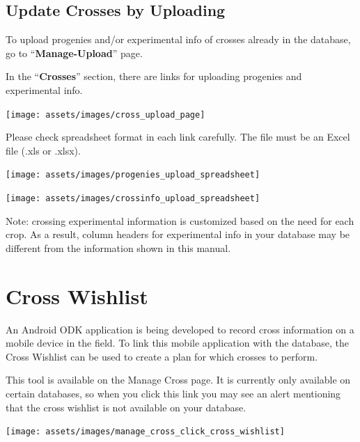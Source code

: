 \documentclass[
  12pt,
]{book}
\begin{document}
\hypertarget{update-crosses-by-uploading}{%
\subsection{Update Crosses by Uploading}\label{update-crosses-by-uploading}}

To upload progenies and/or experimental info of crosses already in the database, go to ``\textbf{Manage-Upload}'' page.

In the ``\textbf{Crosses}'' section, there are links for uploading progenies and experimental info.

\begin{center}\texttt{[image: assets/images/cross\_upload\_page]} \end{center}

Please check spreadsheet format in each link carefully. The file must be an Excel file (.xls or .xlsx).

\begin{center}\texttt{[image: assets/images/progenies\_upload\_spreadsheet]} \end{center}

\begin{center}\texttt{[image: assets/images/crossinfo\_upload\_spreadsheet]} \end{center}

Note: crossing experimental information is customized based on the need for each crop. As a result, column headers for experimental info in your database may be different from the information shown in this manual.

\hypertarget{cross-wishlist}{%
\section{Cross Wishlist}\label{cross-wishlist}}

An Android ODK application is being developed to record cross information on a mobile device in the field. To link this mobile application with the database, the Cross Wishlist can be used to create a plan for which crosses to perform.

This tool is available on the Manage Cross page. It is currently only available on certain databases, so when you click this link you may see an alert mentioning that the cross wishlist is not available on your database.

\begin{center}\texttt{[image: assets/images/manage\_cross\_click\_cross\_wishlist]} \end{center}
\end{document}

